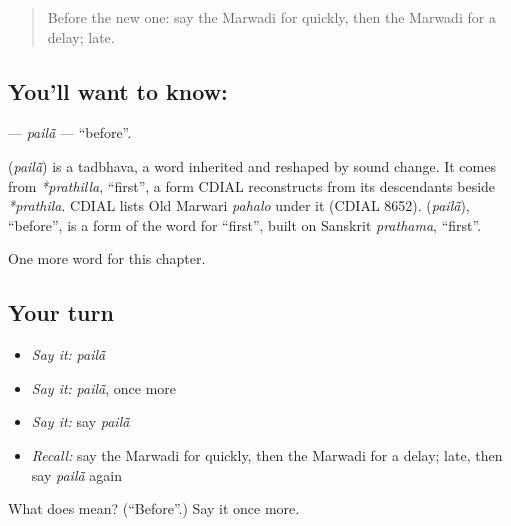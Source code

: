 \label{lesson:MW-C80-paila}



\begin{quote}
Before the new one: say the Marwadi for quickly, then the Marwadi for a delay; late.
\end{quote}

\subsection*{You'll want to know: }
\textbf{} — \emph{pailā̃} — \textquotedblleft{}before\textquotedblright{}.

\begin{cousinweb}
\textbf{} (\emph{pailā̃}) is a tadbhava, a word inherited and reshaped by sound change. It comes from \emph{*prathilla}, \textquotedblleft{}first\textquotedblright{}, a form CDIAL reconstructs from its descendants beside \emph{*prathila}. CDIAL lists Old Marwari \emph{pahalo} under it (CDIAL 8652). \textbf{} (\emph{pailā̃}), \textquotedblleft{}before\textquotedblright{}, is a form of the word for \textquotedblleft{}first\textquotedblright{}, built on Sanskrit \emph{prathama}, \textquotedblleft{}first\textquotedblright{}.
\end{cousinweb}

\begin{grammarlens}[title={What you've built}]
One more word for this chapter.
\end{grammarlens}

\subsection*{Your turn}
\begin{itemize}
\raggedright
  \item \emph{Say it:} \emph{pailā̃}
  \item \emph{Say it:} \emph{pailā̃}, once more
  \item \emph{Say it:} say \emph{pailā̃}
  \item \emph{Recall:} say the Marwadi for quickly, then the Marwadi for a delay; late, then say \emph{pailā̃} again
\end{itemize}

\begin{tcolorbox}[breakable,colback=teal!4,colframe=teal!35!black,title={Before you move on}]
What does  mean? (\textquotedblleft{}Before\textquotedblright{}.) Say it once more.
\end{tcolorbox}
